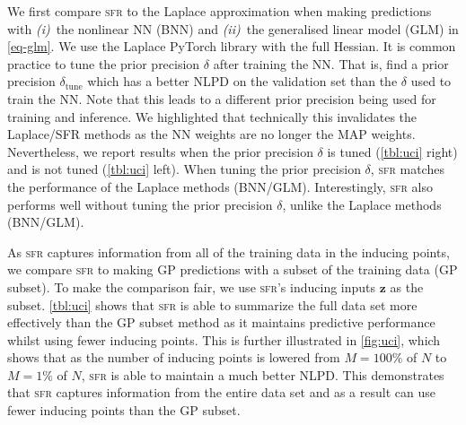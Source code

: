 \documentclass{article}
\newcommand{\our}{\textsc{sfr}\xspace}
\newcommand{\mbf}[1]{\mathbf{#1}}
\newcommand{\vz}{\mbf{z}}
\begin{document}
We first compare \our to the Laplace approximation when making predictions with {\em (i)}~the nonlinear NN (BNN) and {\em (ii)}~the generalised linear model (GLM) in \cref{eq-glm}.
We use the Laplace PyTorch library \citep{daxberger2021laplace} with the full Hessian. %
It is common practice to tune the prior precision $\delta$ after training the NN.
That is, find a prior precision $\delta_{\text{tune}}$ which has a better NLPD on the validation set than the $\delta$ used to train the NN.
Note that this leads to a different prior precision being used for training and inference.
We highlighted that technically this invalidates the Laplace/SFR methods as the NN weights are no longer the MAP weights.
Nevertheless, we report results when the prior precision $\delta$ is tuned (\cref{tbl:uci} right) and is not tuned (\cref{tbl:uci} left).
When tuning the prior precision $\delta$, \our matches the performance of the Laplace methods (BNN/GLM).
Interestingly, \our also  performs well without tuning the prior precision $\delta$, unlike the Laplace methods (BNN/GLM).

As \our captures information from all of the training data in the inducing points, we compare \our to making GP predictions with a subset of the training data (GP subset).
To make the comparison fair, we use \our's inducing inputs $\vz$ as the subset.
\cref{tbl:uci} shows that \our is able to summarize the full data set more effectively than the GP subset method as it maintains predictive performance
whilst using fewer inducing points.
This is further illustrated in \cref{fig:uci}, which shows that as the number of inducing points is lowered from $M=100\%$ of $N$ to $M=1\%$ of $N$,
\our is able to maintain a much better NLPD.
This demonstrates that \our  captures information from the entire data set and as a result can use fewer inducing points than the GP subset.

\end{document}
